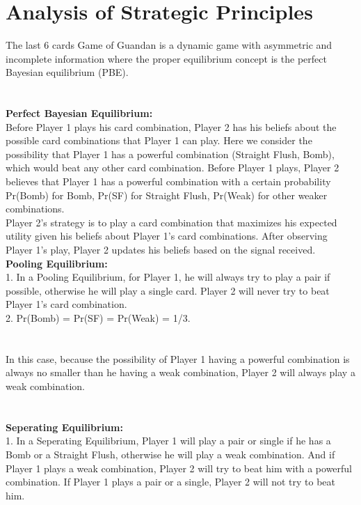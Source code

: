 \documentclass{article}
\begin{document}
\section{Analysis of Strategic Principles}
The last 6 cards Game of Guandan is a dynamic game with asymmetric and incomplete information
where the proper equilibrium concept is the perfect Bayesian equilibrium (PBE). \\
\\ \hspace*{\fill} \\
\textbf{Perfect Bayesian Equilibrium:}\\
Before Player 1 plays his card combination, Player 2 has his beliefs about the possible card combinations that Player 1 can play. Here we consider the possibility that Player 1 has a powerful combination (Straight Flush, Bomb), which would beat any other card combination. 
Before Player 1 plays, Player 2 believes that Player 1 has a powerful combination with a certain probability Pr(Bomb) for Bomb, Pr(SF) for Straight Flush, Pr(Weak) for other weaker combinations.\\
Player 2's strategy is to play a card combination that maximizes his expected utility given his beliefs about Player 1's card combinations. After observing Player 1's play, Player 2 updates his beliefs based on the signal received. \\
\textbf{Pooling Equilibrium:}\\
1. In a Pooling Equilibrium, for Player 1, he will always try to play a pair if possible, otherwise he will play a single card. Player 2 will never try to beat Player 1's card combination.\\
2. Pr(Bomb) = Pr(SF) = Pr(Weak) = 1/3.\\
\\ \hspace*{\fill} \\
In this case, because the possibility of Player 1 having a powerful combination is always no smaller than he having a weak combination, Player 2 will always play a weak combination.\\
\\ \hspace*{\fill} \\
\textbf{Seperating Equilibrium:}\\ 
1. In a Seperating Equilibrium, Player 1 will play a pair or single if he has a Bomb or a Straight Flush, otherwise he will play a weak combination. 
And if Player 1 plays a weak combination, Player 2 will try to beat him with a powerful combination. If Player 1 plays a pair or a single, Player 2 will not try to beat him.\\
\end{document}
